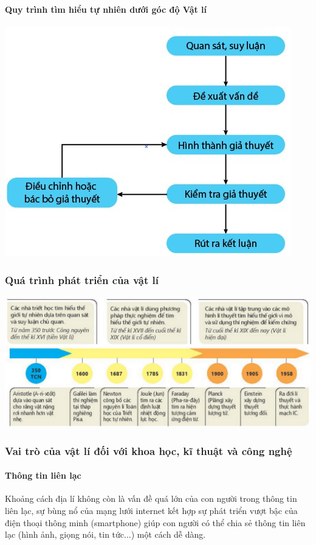 \begin{tomtat}
	\paragraph{Quy trình tìm hiểu tự nhiên dưới góc độ Vật lí}
	\begin{center}
		\includegraphics[scale=0.7]{figs/G10Y25B1-2}
	\end{center}
	\subsubsection{Quá trình phát triển của vật lí}
	\begin{center}
		\includegraphics[scale=0.9]{figs/G10Y25B1-1}
	\end{center}
	\subsubsection{Vai trò của vật lí đối với khoa học, kĩ thuật và công nghệ}
	\paragraph{Thông tin liên lạc}
	Khoảng cách địa lí không còn là vấn đề quá lớn của con người trong thông tin liên lạc, sự bùng nổ của mạng lưới internet kết hợp sự phát triển vượt bậc của điện thoại thông minh (smartphone) giúp con người có thể chia sẻ thông tin liên lạc (hình ảnh, giọng nói, tin tức...) một cách dễ dàng.

\end{tomtat}
